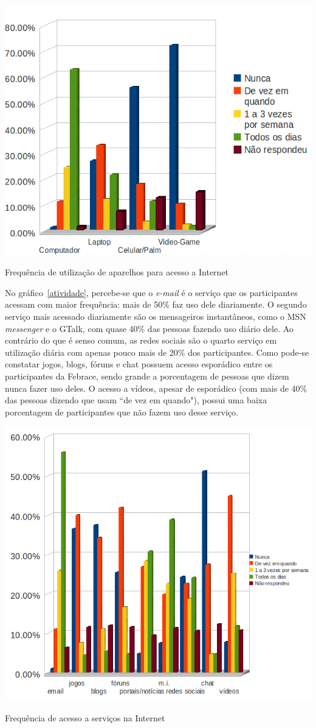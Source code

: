    \begin{grafico}
        \begin{center}
    \includegraphics[width=0.7\linewidth]{arquivos/dispositivo.png}
        \end{center}
        \caption{Frequência de utilização de aparelhos para acesso a Internet}
        \label{dispositivo}
    \end{grafico}

    No gráfico~\ref{atividade}, percebe-se que o \textit{e-mail} é o serviço que os participantes acessam com maior frequência: mais de 50\% faz uso dele diariamente. O segundo serviço mais acessado diariamente são os mensageiros instantâneos, como o MSN \textit{messenger} e o GTalk, com quase 40\%  das pessoas fazendo uso diário dele. Ao contrário do que é senso comum, as redes sociais são o quarto serviço em utilização diária com apenas pouco mais de 20\% dos participantes. Como pode-se constatar jogos, blogs, fóruns e chat possuem acesso esporádico entre os participantes da Febrace, sendo grande a porcentagem de pessoas que dizem nunca fazer uso deles. O acesso a vídeos, apesar de esporádico (com mais de 40\% das pessoas dizendo que usam “de vez em quando"), possui uma baixa porcentagem de participantes que não fazem uso desse serviço.

    \begin{grafico}
        \begin{center}
    \includegraphics[width=0.7\linewidth]{arquivos/atividade.png}
        \end{center}
        \caption{Frequência de acesso a serviços na Internet}
        \label{atividade}
    \end{grafico}

